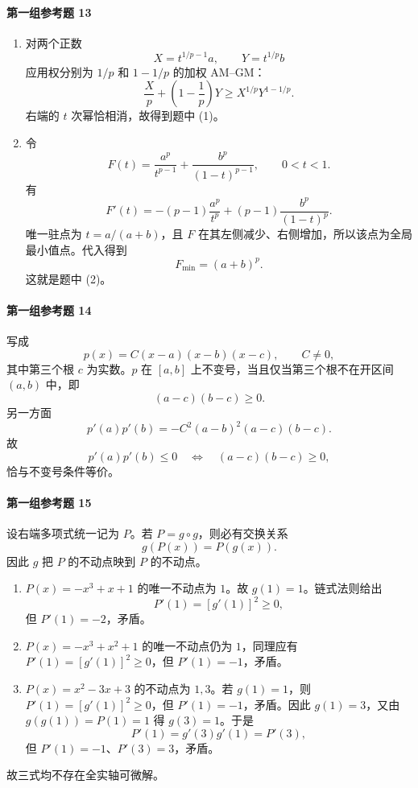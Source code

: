 \paragraph{第一组参考题 13}
\begin{xsolution}
\begin{enumerate}[label=(\arabic*)]
  \item 对两个正数
  \[
    X=t^{1/p-1}a,
    \qquad Y=t^{1/p}b
  \]
  应用权分别为 $1/p$ 和 $1-1/p$ 的加权 AM--GM：
  \[
    \frac Xp+\left(1-\frac1p\right)Y
    \ge X^{1/p}Y^{1-1/p}.
  \]
  右端的 $t$ 次幂恰相消，故得到题中 (1)。

  \item 令
  \[
    F(t)=\frac{a^p}{t^{p-1}}+
          \frac{b^p}{(1-t)^{p-1}},\qquad0<t<1.
  \]
  有
  \[
    F'(t)=-(p-1)\frac{a^p}{t^p}
    +(p-1)\frac{b^p}{(1-t)^p}.
  \]
  唯一驻点为 $t=a/(a+b)$，且 $F$ 在其左侧减少、右侧增加，所以该点为全局最小值点。代入得到
  \[
    F_{\min}=(a+b)^p.
  \]
  这就是题中 (2)。
\end{enumerate}
\end{xsolution}

\paragraph{第一组参考题 14}
\begin{xsolution}
写成
\[
  p(x)=C(x-a)(x-b)(x-c),\qquad C\ne0,
\]
其中第三个根 $c$ 为实数。$p$ 在 $[a,b]$ 上不变号，当且仅当第三个根不在开区间 $(a,b)$ 中，即
\[
  (a-c)(b-c)\ge0.
\]
另一方面
\[
  p'(a)p'(b)
  =-C^2(a-b)^2(a-c)(b-c).
\]
故
\[
  p'(a)p'(b)\le0
  \quad\Longleftrightarrow\quad
  (a-c)(b-c)\ge0,
\]
恰与不变号条件等价。
\end{xsolution}

\paragraph{第一组参考题 15}
\begin{xsolution}
设右端多项式统一记为 $P$。若 $P=g\circ g$，则必有交换关系
\[
  g(P(x))=P(g(x)).
\]
因此 $g$ 把 $P$ 的不动点映到 $P$ 的不动点。
\begin{enumerate}[label=(\arabic*)]
  \item $P(x)=-x^3+x+1$ 的唯一不动点为 $1$。故 $g(1)=1$。链式法则给出
  \[
    P'(1)=[g'(1)]^2\ge0,
  \]
  但 $P'(1)=-2$，矛盾。

  \item $P(x)=-x^3+x^2+1$ 的唯一不动点仍为 $1$，同理应有 $P'(1)=[g'(1)]^2\ge0$，但 $P'(1)=-1$，矛盾。

  \item $P(x)=x^2-3x+3$ 的不动点为 $1,3$。若 $g(1)=1$，则 $P'(1)=[g'(1)]^2\ge0$，但 $P'(1)=-1$，矛盾。因此 $g(1)=3$，又由 $g(g(1))=P(1)=1$ 得 $g(3)=1$。于是
  \[
    P'(1)=g'(3)g'(1)=P'(3),
  \]
  但 $P'(1)=-1$、$P'(3)=3$，矛盾。
\end{enumerate}
故三式均不存在全实轴可微解。
\end{xsolution}

